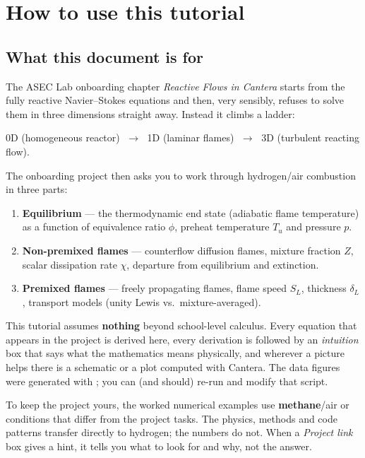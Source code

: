 \chapter{How to use this tutorial}
\label{ch:roadmap}

\section{What this document is for}

The ASEC Lab onboarding chapter \emph{Reactive Flows in Cantera} starts from the fully reactive
Navier--Stokes equations and then, very sensibly, refuses to solve them in three dimensions
straight away. Instead it climbs a ladder:
\begin{center}
0D (homogeneous reactor) $\;\longrightarrow\;$ 1D (laminar flames) $\;\longrightarrow\;$ 3D (turbulent reacting flow).
\end{center}
The onboarding project then asks you to work through hydrogen/air combustion in three parts:
\begin{enumerate}[label=\textbf{Part \arabic*:}]
  \item \textbf{Equilibrium} --- the thermodynamic end state (adiabatic flame temperature) as a function
        of equivalence ratio $\phi$, preheat temperature $T_u$ and pressure $p$.
  \item \textbf{Non-premixed flames} --- counterflow diffusion flames, mixture fraction $Z$, scalar
        dissipation rate $\chi$, departure from equilibrium and extinction.
  \item \textbf{Premixed flames} --- freely propagating flames, flame speed $S_L$, thickness
        $\delta_L$, transport models (unity Lewis vs.\ mixture-averaged).
\end{enumerate}

This tutorial assumes \textbf{nothing} beyond school-level calculus. Every equation that appears in
the project is derived here, every derivation is followed by an \emph{intuition} box that says
what the mathematics means physically, and wherever a picture helps there is a schematic or a
plot computed with Cantera. The data figures were generated with
; you can (and should) re-run and modify that script.

\begin{warning}
To keep the project yours, the worked numerical examples use \textbf{methane}/air or conditions
that differ from the project tasks. The physics, methods and code patterns transfer directly to
hydrogen; the numbers do not. When a \emph{Project link} box gives a hint, it tells you what to
look for and why, not the answer.
\end{warning}

